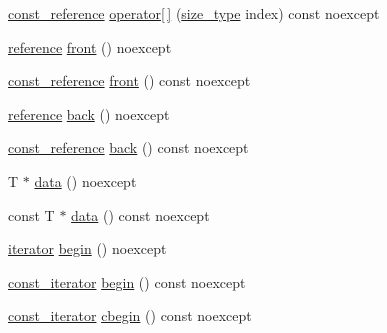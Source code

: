 \begin{DoxyCompactItemize}
\item 
\mbox{\hyperlink{classmage_1_1_static_memory_buffer_a2d961d7baf56ebc96e1e48579bcdcb84}{const\+\_\+reference}} \mbox{\hyperlink{classmage_1_1_static_memory_buffer_a5286b326f608cdfc5411346dcc75a2cd}{operator\mbox{[}$\,$\mbox{]}}} (\mbox{\hyperlink{classmage_1_1_static_memory_buffer_a13e19b7af61a49400c5be360f09aadc8}{size\+\_\+type}} index) const noexcept
\item 
\mbox{\hyperlink{classmage_1_1_static_memory_buffer_ac00b0718b8b57bcaee2a7904637fc031}{reference}} \mbox{\hyperlink{classmage_1_1_static_memory_buffer_a2aa14c910216dce870c415752801d04d}{front}} () noexcept
\item 
\mbox{\hyperlink{classmage_1_1_static_memory_buffer_a2d961d7baf56ebc96e1e48579bcdcb84}{const\+\_\+reference}} \mbox{\hyperlink{classmage_1_1_static_memory_buffer_a14321e82ca518c411b14fc53a4789b34}{front}} () const noexcept
\item 
\mbox{\hyperlink{classmage_1_1_static_memory_buffer_ac00b0718b8b57bcaee2a7904637fc031}{reference}} \mbox{\hyperlink{classmage_1_1_static_memory_buffer_acd908ab5553b6313404f7c2b2de10563}{back}} () noexcept
\item 
\mbox{\hyperlink{classmage_1_1_static_memory_buffer_a2d961d7baf56ebc96e1e48579bcdcb84}{const\+\_\+reference}} \mbox{\hyperlink{classmage_1_1_static_memory_buffer_ac53cedcbc9f9396c8eb958b1188e48ac}{back}} () const noexcept
\item 
T $\ast$ \mbox{\hyperlink{classmage_1_1_static_memory_buffer_a0a4c4fbfe3d529b12b8c0622e3d03e16}{data}} () noexcept
\item 
const T $\ast$ \mbox{\hyperlink{classmage_1_1_static_memory_buffer_aa32a9b037a0ee4fe98dae0a245bce50c}{data}} () const noexcept
\item 
\mbox{\hyperlink{classmage_1_1_static_memory_buffer_abeee1c933cd54117e1a92de4a1cc698f}{iterator}} \mbox{\hyperlink{classmage_1_1_static_memory_buffer_aa40e217fad7fd0199a3df00fdd152193}{begin}} () noexcept
\item 
\mbox{\hyperlink{classmage_1_1_static_memory_buffer_aa871d2967d2e9f4219ab47c16563e328}{const\+\_\+iterator}} \mbox{\hyperlink{classmage_1_1_static_memory_buffer_a616c34676040288167689ee0c9660cb1}{begin}} () const noexcept
\item 
\mbox{\hyperlink{classmage_1_1_static_memory_buffer_aa871d2967d2e9f4219ab47c16563e328}{const\+\_\+iterator}} \mbox{\hyperlink{classmage_1_1_static_memory_buffer_a49146a3f7659bba4ca21ff6aae135c5b}{cbegin}} () const noexcept
\item 

\end{DoxyCompactItemize}
